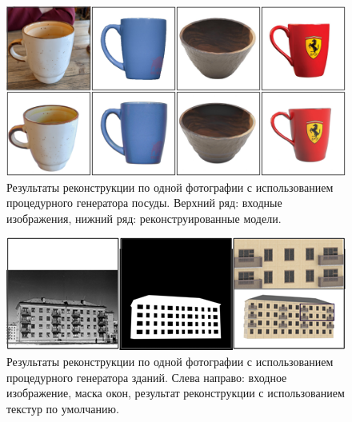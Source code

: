 \documentclass[a4paper,hidelinks,12pt]{article}
\begin{document}
\begin{figure}[H]
\begin{center}
	\includegraphics[width=15 cm]{results.png}
	\caption{Результаты реконструкции по одной фотографии с использованием процедурного генератора посуды. Верхний ряд: входные изображения, нижний ряд: реконструированные модели.}
 	\label{fig_dishes_r}
\end{center}
\end{figure}

\begin{figure}[H]
\begin{center}
	\includegraphics[width=15 cm]{houses_res.png}
	\caption{Результаты реконструкции по одной фотографии с использованием процедурного генератора зданий. Слева направо: входное изображение, маска окон, результат реконструкции с использованием текстур по умолчанию.}
 	\label{fig_houses_r}
\end{center}
\end{figure}
\end{document}
